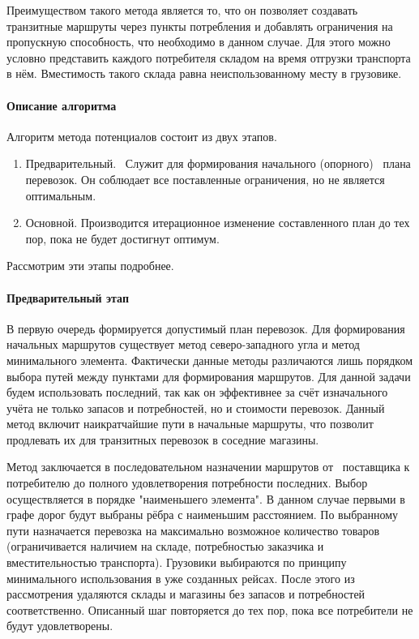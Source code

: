 	Преимуществом такого метода является то, что он позволяет создавать транзитные маршруты через пункты потребления и добавлять ограничения на пропускную способность, что необходимо в данном случае. Для этого можно условно представить каждого потребителя складом на время отгрузки транспорта в нём. Вместимость такого склада равна неиспользованному месту в грузовике.
	
	\paragraph{Описание алгоритма}
	
	Алгоритм метода потенциалов состоит из двух этапов.
	\begin{enumerate}
		\item Предварительный. \, Служит для формирования начального (опорного) \, плана перевозок. Он соблюдает все поставленные ограничения, но не является оптимальным.
		\item Основной. Производится итерационное изменение составленного план до тех пор, пока не будет достигнут оптимум.
	\end{enumerate} 

	Рассмотрим эти этапы подробнее.
	
	\paragraph{Предварительный этап}
	
	В первую очередь формируется допустимый план перевозок. Для формирования начальных маршрутов существует метод северо-западного угла и метод минимального элемента\cite{trans:comporation}. Фактически данные методы различаются лишь порядком выбора путей между пунктами для формирования маршрутов. Для данной задачи будем использовать последний, так как он эффективнее \cite{potential:polyindex} за счёт изначального учёта не только запасов и потребностей, но и стоимости перевозок. Данный метод включит наикратчайшие пути в начальные маршруты, что позволит продлевать их для транзитных перевозок в соседние магазины.
	
	Метод заключается в последовательном назначении маршрутов от \, поставщика к потребителю до полного удовлетворения потребности последних. Выбор осуществляется в порядке "наименьшего элемента". В данном случае первыми в графе дорог будут выбраны рёбра с наименьшим расстоянием. По выбранному пути назначается перевозка на максимально возможное количество товаров (ограничивается наличием на складе, потребностью заказчика и вместительностью транспорта). Грузовики выбираются по принципу \, минимального использования в уже созданных рейсах. После этого из рассмотрения удаляются склады и магазины без запасов и потребностей соответственно. Описанный шаг повторяется до тех пор, пока все потребители не будут удовлетворены.
	
